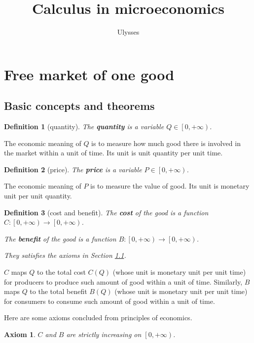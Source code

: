 \documentclass{article}
\title{Calculus in microeconomics}
\author{Ulysses}
\newtheorem{axiom}{Axiom}
\newtheorem{definition}{Definition}
\begin{document}
\maketitle

\tableofcontents

\section{Free market of one good}

\subsection{Basic concepts and theorems}
\label{basic}

\begin{definition}[quantity]
The \textbf{quantity} is a variable $Q\in\left[0,+\infty\right)$.
\end{definition}

The economic meaning of $Q$ is to measure how much good there is involved in the market within a unit of time.
Its unit is unit quantity per unit time.

\begin{definition}[price]
The \textbf{price} is a variable $P\in\left[0,+\infty\right)$.
\end{definition}

The economic meaning of $P$ is to measure the value of good.
Its unit is monetary unit per unit quantity.

\begin{definition}[cost and benefit]
The \textbf{cost} of the good is a function $C:\left[0,+\infty\right)\to\left[0,+\infty\right)$.

The \textbf{benefit} of the good is a function $B:\left[0,+\infty\right)\to\left[0,+\infty\right)$.

They satisfies the axioms in Section \ref{basic}.
\end{definition}

$C$ maps $Q$ to the total cost $C\left(Q\right)$ (whose unit is monetary unit per unit time) for producers to produce such amount of good within a unit of time.
Similarly, $B$ maps $Q$ to the total benefit $B\left(Q\right)$ (whose unit is monetary unit per unit time) for consumers to consume such amount of good within a unit of time.

Here are some axioms concluded from principles of economics.

\begin{axiom}
\label{monoticity}
$C$ and $B$ are strictly increasing on $\left[0,+\infty\right)$.
\end{axiom}
\end{document}
